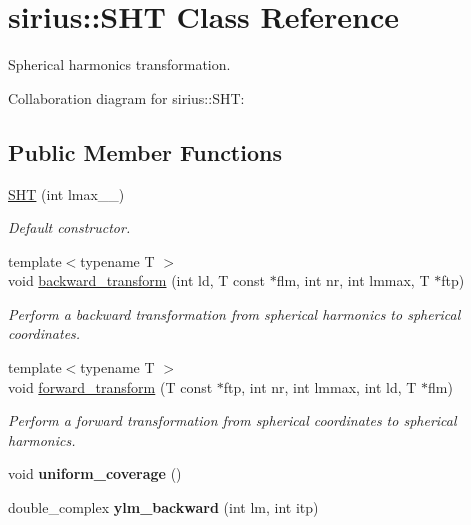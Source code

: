 \hypertarget{classsirius_1_1_s_h_t}{}\section{sirius\+:\+:S\+H\+T Class Reference}
\label{classsirius_1_1_s_h_t}


Spherical harmonics transformation.  




Collaboration diagram for sirius\+:\+:S\+H\+T\+:
\subsection*{Public Member Functions}
\begin{DoxyCompactItemize}
\item 
\hyperlink{classsirius_1_1_s_h_t_ac405f7103925e591e2525d2ccc763ed1}{S\+H\+T} (int lmax\+\_\+\+\_\+)
\begin{DoxyCompactList}\small\item\em Default constructor. \end{DoxyCompactList}\item 
{\footnotesize template$<$typename T $>$ }\\void \hyperlink{classsirius_1_1_s_h_t_a13e22fe05ff2a84fc28089fa89a7a623}{backward\+\_\+transform} (int ld, T const $\ast$flm, int nr, int lmmax, T $\ast$ftp)
\begin{DoxyCompactList}\small\item\em Perform a backward transformation from spherical harmonics to spherical coordinates. \end{DoxyCompactList}\item 
{\footnotesize template$<$typename T $>$ }\\void \hyperlink{classsirius_1_1_s_h_t_a7cd824190c66d3ea87e13970602c9591}{forward\+\_\+transform} (T const $\ast$ftp, int nr, int lmmax, int ld, T $\ast$flm)
\begin{DoxyCompactList}\small\item\em Perform a forward transformation from spherical coordinates to spherical harmonics. \end{DoxyCompactList}\item 
\hypertarget{classsirius_1_1_s_h_t_a1ede7201294b450cd468ba093c4114c2}{}void {\bfseries uniform\+\_\+coverage} ()\label{classsirius_1_1_s_h_t_a1ede7201294b450cd468ba093c4114c2}

\item 
\hypertarget{classsirius_1_1_s_h_t_a15e0125bb5e48c370a53b9f8720cd169}{}double\+\_\+complex {\bfseries ylm\+\_\+backward} (int lm, int itp)\label{classsirius_1_1_s_h_t_a15e0125bb5e48c370a53b9f8720cd169}


\end{DoxyCompactItemize}

